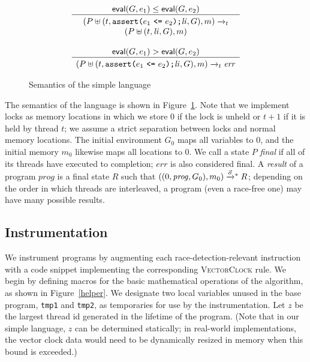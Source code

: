 \documentclass[preprint, 10pt]{sigplanconf}
\newcommand{\VCalg}{\textsc{VectorClock}\xspace}
\newcommand{\assert}[2]{\texttt{assert(}#1\ \texttt{<=}\ #2\texttt{)}}
\newcommand{\cfg}[2]{\ensuremath{(#1, #2)}}
\newcommand{\anarrow}[2]{\ensuremath{\xrightarrow{#2}_{#1}}}
\newcommand{\execstar}[4]{\ensuremath{\cfg{#1}{#2} \tto{#3} #4}}
\newcommand{\tto}[1]{\mathrel{
  \vphantom{\xrightarrow{#1}}
  \smash{\xrightarrow{#1}}
  \vphantom{\to}^{*}}
}
\begin{document}
\begin{figure}[tb]
\[\begin{array}{c}
\multicolumn{1}{c}{\mathsf{eval}(G, e_1) \le \mathsf{eval}(G, e_2)}
\\ \hline \rule{0pt}{2.5ex}
\cfg{P \uplus (t, \assert{e_1}{e_2}\texttt{;} \mathit{li}, G)}{m}
\anarrow{t}{} \\
\cfg{P \uplus (t, \mathit{li}, G)}{m}
\\\\

\multicolumn{1}{c}{\mathsf{eval}(G, e_1) > \mathsf{eval}(G, e_2)}
\\ \hline \rule{0pt}{2.5ex}
\cfg{P \uplus (t, \assert{e_1}{e_2}\texttt{;} \mathit{li}, G)}{m}
\anarrow{t}{} 
\mathit{err}
\end{array}
\]







\caption{Semantics of the simple language}
\label{semantics}
\end{figure}
The semantics of the language is shown in Figure~\ref{semantics}. Note that we implement locks as memory locations in which we store 0 if the lock is unheld or $t + 1$ if it is held by thread $t$; we assume a strict separation between locks and normal memory locations. The initial environment $G_0$ maps all variables to 0, and the initial memory $m_0$ likewise maps all locations to 0. We call a state $P$ \emph{final} if all of its threads have executed to completion; $\mathit{err}$ is also considered final. A \emph{result} of a program $\mathit{prog}$ is a final state $R$ such that \execstar{(0, \mathit{prog}, G_0)}{m_0}{\vec{o}}{R}; depending on the order in which threads are interleaved, a program (even a race-free one) may have many possible results.

\subsection{Instrumentation}
We instrument programs by augmenting each race-detection-relevant instruction with a code snippet implementing the corresponding \VCalg rule. We begin by defining macros for the basic mathematical operations of the algorithm, as shown in Figure~\ref{helper}. We designate two local variables unused in the base program, \texttt{tmp1} and \texttt{tmp2}, as temporaries for use by the instrumentation. Let $z$ be the largest thread id generated in the lifetime of the program. (Note that in our simple language, $z$ can be determined statically; in real-world implementations, the vector clock data would need to be dynamically resized in memory when this bound is exceeded.)
\end{document}
